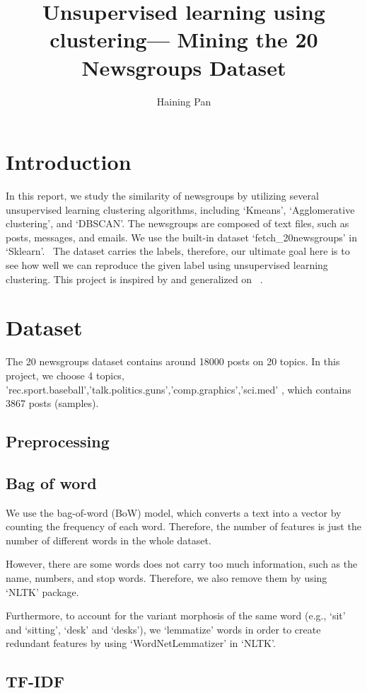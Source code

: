 \documentclass{article}
\title{Unsupervised learning using clustering--- Mining the 20 Newsgroups Dataset}
\author{Haining Pan}
\begin{document}
    \maketitle
    \section{Introduction}
    In this report, we study the similarity of newsgroups by utilizing several unsupervised learning clustering algorithms, including `Kmeans', `Agglomerative clustering', and `DBSCAN'.
    The newsgroups are composed of text files, such as posts, messages, and emails. 
    We use the built-in dataset `fetch\_20newsgroups' in `Sklearn'.~\cite{20newsgroups}
    The dataset carries the labels, therefore, our ultimate goal here is to see how well we can reproduce the given label using unsupervised learning clustering. This project is inspired by and generalized on ~\cite{book}.
    \section{Dataset}
    The 20 newsgroups dataset contains around 18000 posts on 20 topics. In this project, we choose 4 topics, 'rec.sport.baseball','talk.politics.guns','comp.graphics','sci.med' , which contains 3867 posts (samples).

    \subsection{Preprocessing}
    \subsection{Bag of word}
    We use the bag-of-word (BoW) model, which converts a text into a vector by counting the frequency of each word. Therefore, the number of features is just the number of different words in the whole dataset.

    However, there are some words does not carry too much information, such as the name, numbers, and stop words. Therefore, we also remove them by using `NLTK' package. 

    Furthermore, to account for the variant morphosis of the same word (e.g., `sit' and `sitting', `desk' and `desks'), we `lemmatize' words in order to create redundant features by using `WordNetLemmatizer' in `NLTK'.

    \subsection{TF-IDF}
\end{document}
